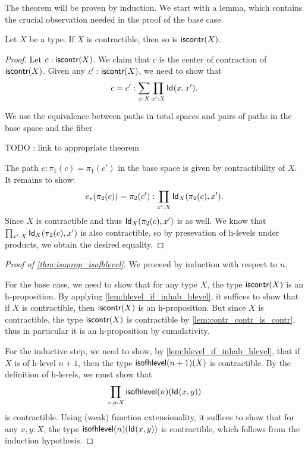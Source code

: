 The theorem will be proven by induction. We start with a lemma, which contains the crucial observation needed in the proof of the base case.

\begin{lem}\label{lem:contr_contr_is_contr}
  Let $X$ be a type. If $X$ is contractible, then so is $\iscontr(X)$.
\end{lem}

\begin{proof}
 Let $c : \iscontr(X)$. We claim that $c$ is the center of contraction of $\iscontr (X)$.
  Given any $c' : \iscontr (X)$, we need to show that
       \[ c = c' : \sum_{x:X}\prod_{x':X}\idtype{x}{x'}  . \]

 We use the equivalence between paths in total spaces and pairs of paths in the base space and the fiber

 TODO : link to appropriate theorem

 The path $e : \pi_1(c) = \pi_1 (c')$ in the base space is given by contractibility of $X$.
 It remains to show:
 \[ \trans{e}{\pi_2(c)} = \pi_2 (c') : \prod_{x' : X} \idtype[X]{\pi_2 (c)} {x'}  .  \]
 Since $X$ is contractible and thus $\idtype[X]{\pi_2 (c)} {x'}$ is as well.
 We know that $\prod_{x' : X} \idtype[X]{\pi_2 (c)} {x'}$
 is also contractible, so by presevation of h-levels under products, we obtain the desired equality.
\end{proof}

\begin{proof}[Proof of \autoref{thm:isaprop_isofhlevel}]
  We proceed by induction with respect to $n$.
  
 For the base case, we need to show that for any type $X$, the type $\iscontr(X)$ is an
        h-proposition. By applying \autoref{lem:hlevel_if_inhab_hlevel}, it suffices to show that
        if $X$ is contractible, then $\iscontr(X)$ is an h-proposition.
        But since $X$ is contractible, the type $\iscontr(X)$ is contractible by \autoref{lem:contr_contr_is_contr},
          thus in particular it is an h-proposition by cumulativity.
 
 For the inductive step, we need to show, by \autoref{lem:hlevel_if_inhab_hlevel}, that if
        $X$ is of h-level $n+1$, then the type $\isofhlevel(n+1)(X)$ is contractible.
        By the definition of h-levels, we must show that
     \[  \prod_{x,y:X} \isofhlevel(n)(\idtype{x}{y}) \]
    is contractible. Using (weak) function extensionality, it suffices to show that for any $x,y : X$,
     the type $\isofhlevel(n)(\idtype{x}{y})$ is contractible, which follows from the induction hypothesis.
\end{proof}

